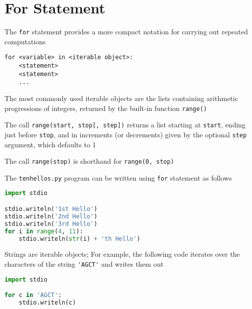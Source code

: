 \documentclass[8pt,a4paper,compress]{beamer}
\begin{document}
\section{For Statement}
\begin{frame}[fragile]
The \lstinline{for} statement provides a more compact notation for carrying out repeated computations

\smallskip

\begin{lstlisting}[language={}]
for <variable> in <iterable object>:
    <statement>
    <statement>
    ...
\end{lstlisting}

\bigskip

The most commonly used iterable objects are the lists containing arithmetic progressions of integers, returned by the built-in function \lstinline{range()}

\bigskip

The call \lstinline{range(start, stop[, step])} returns a list starting at \lstinline{start}, ending just before \lstinline{stop}, and in increments (or decrements) given by the optional \lstinline{step} argument, which defaults to 1

\bigskip

The call \lstinline{range(stop)} is shorthand for \lstinline{range(0, stop)}
\end{frame}

\begin{frame}[fragile]
The \lstinline{tenhellos.py} program can be written using \lstinline{for} statement as follows

\begin{lstlisting}[language=Python]
import stdio

stdio.writeln('1st Hello')
stdio.writeln('2nd Hello')
stdio.writeln('3rd Hello')
for i in range(4, 11):
    stdio.writeln(str(i) + 'th Hello')
\end{lstlisting}

\bigskip

Strings are iterable objects; For example, the following code iterates over the characters of the string \lstinline{'AGCT'} and writes them out
\begin{lstlisting}[language=Python]
import stdio

for c in 'AGCT':
    stdio.writeln(c)
\end{lstlisting}
\end{frame}
\end{document}
